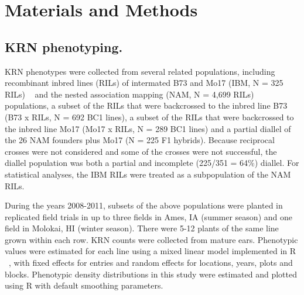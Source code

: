 \documentclass[10pt,letterpaper]{article}
\providecommand{\DIFaddtex}[1]{{\protect\color{blue}\uwave{#1}}} %
\providecommand{\DIFaddbegin}{} %
\providecommand{\DIFaddend}{} %
\providecommand{\DIFadd}[1]{\texorpdfstring{\DIFaddtex{#1}}{#1}} %
\begin{document}

\section*{Materials and Methods}
\subsection*{KRN phenotyping.}

KRN phenotypes were collected from several related populations, including recombinant inbred lines (RILs) of intermated B73 and Mo17 (IBM, N = 325 RILs) ~\cite{Lee2002} and the nested association mapping (NAM, N = 4,699 RILs) ~\cite{Yu2008} populations, a subset of the RILs that were backcrossed to the inbred line B73 (B73 x RILs, N = 692 BC1 lines), a subset of the RILs that were backcrossed to the inbred line Mo17 (Mo17 x RILs, N = 289 BC1 lines) and a partial diallel of the 26 NAM founders plus Mo17 (N = 225 F1 hybrids). Because reciprocal crosses were not considered and some of the crosses were not successful, the diallel population was both a partial and incomplete (225/351 = 64\%) diallel. For statistical analyses, the IBM RILs were treated as a subpopulation of the NAM RILs.

During the years 2008-2011, subsets of the above populations were planted in replicated field trials in up to three fields in Ames, IA (summer season) and one field in Molokai, HI (winter season). There were 5-12 plants of the same line grown within each row. KRN counts were collected from mature ears. Phenotypic values were estimated for each line using a mixed linear model implemented in R ~\cite{DevelopmentCoreTeam2011}, with fixed effects for entries and random effects for \DIFaddbegin \DIFadd{trials, }\DIFaddend locations, years, plots and blocks. Phenotypic density distributions in this study were estimated and plotted using R with default smoothing parameters. 
\end{document}
